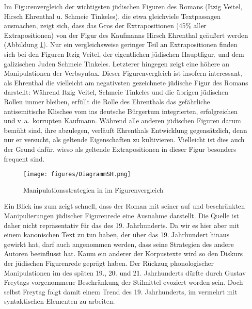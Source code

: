   \largerpage
 Im Figurenvergleich der wichtigsten jüdischen Figuren des Romans (Itzig Veitel, Hirsch Ehrenthal u. Schmeie Tinkeles), die etwa gleichviele Textpassagen ausmachen, zeigt sich, dass das Gros der Extrapositionen (45\% aller Extrapositionen) von der Figur des Kaufmanns Hirsch Ehrenthal geäußert werden (Abbildung \ref{figurenSH}). Nur ein vergleichsweise geringer Teil an Extrapositionen finden sich bei den Figuren Itzig Veitel, der eigentlichen jüdischen Hauptfigur, und dem galizischen Juden Schmeie Tinkeles. Letzterer hingegen zeigt eine höhere  an Manipulationen der Verbsyntax. Dieser Figurenvergleich ist insofern interessant, als Ehrenthal die vielleicht am negativsten gezeichnete jüdische Figur des Romans darstellt: Während Itzig Veitel, Schmeie Tinkeles und die übrigen jüdischen Rollen immer  bleiben, erfüllt die Rolle des Ehrenthals das gefährliche antisemitische Klischee vom ins deutsche Bürgertum integrierten, erfolgreichen und v.\,a.\, korrupten Kaufmann. Während alle anderen jüdischen Figuren darum bemüht sind, ihre  abzulegen, verläuft Ehrenthals Entwicklung gegensätzlich, denn nur er versucht, als  geltende Eigenschaften zu kultivieren. Vielleicht ist dies auch der Grund dafür, wieso als  geltende Extrapositionen in dieser Figur besonders frequent sind. 
  
\begin{figure}
 
\texttt{[image: figures/DiagrammSH.png]}
	\caption{Manipulationsstrategien in  im Figurenvergleich}\label{figurenSH}	
	\end{figure}


 Ein Blick ins  zum \hai{{\LiJi}} zeigt schnell, dass der Roman  mit seiner auf  und \hai{{\VR}} beschränkten Manipulierungen jüdischer Figurenrede eine Ausnahme darstellt. Die Quelle ist daher nicht repräsentativ für das \hai{{\LiJi}} des 19. Jahrhunderts. Da wir es hier aber mit einem kanonischen Text zu tun haben, der über das 19. Jahrhundert hinaus gewirkt hat, darf auch angenommen werden, dass seine Strategien des \hai{{\LiJi}} andere Autoren beeinflusst hat. Kaum ein anderer der Korpustexte wird so den Diskurs der jüdischen Figurenrede geprägt haben. Der Rückzug phonologischer Manipulationen im \hai{{\LiJi}} des späten 19., 20. und 21. Jahrhunderts  dürfte durch Gustav Freytags vorgenommene Beschränkung der Stilmittel evoziert worden sein. Doch selbst Freytag folgt damit einem Trend des 19. Jahrhunderts, im \hai{{\LiJi}} vermehrt mit syntaktischen Elementen zu arbeiten. 


